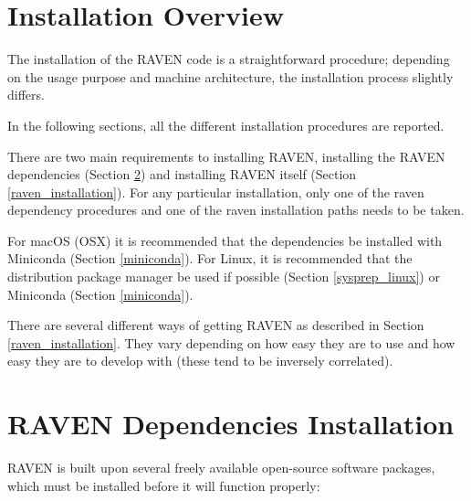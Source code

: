 \section{Installation Overview}

The installation of the RAVEN code is a straightforward procedure;
depending on the usage purpose and machine architecture, the
installation process slightly differs.

In the following sections, all the different installation procedures
are reported.

There are two main requirements to installing RAVEN, installing the
RAVEN dependencies (Section \ref{raven_dependencies}) and installing
RAVEN itself (Section \ref{raven_installation}).  For any particular
installation, only one of the raven dependency procedures and one of
the raven installation paths needs to be taken.

For macOS (OSX) it is recommended that the dependencies be installed with
Miniconda (Section \ref{miniconda}).  For Linux, it is recommended
that the distribution package manager be used if possible (Section
\ref{sysprep_linux}) or Miniconda (Section \ref{miniconda}).

There are several different ways of getting RAVEN as described in
Section \ref{raven_installation}.  They vary depending on how easy
they are to use and how easy they are to develop with (these tend to
be inversely correlated).

\newcommand{\goToRavenInstallation}{Now go on to Section \ref{raven_installation} for Raven installation.
}


\section{RAVEN Dependencies Installation}
\label{raven_dependencies}

RAVEN is built upon several freely available open-source software packages,
which must  be installed before it will function properly:

